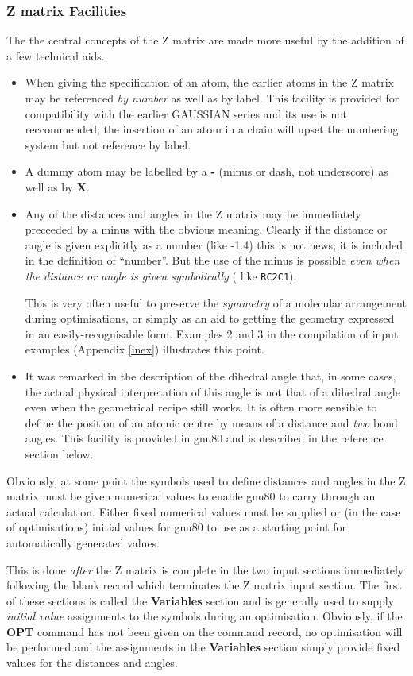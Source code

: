 \subsubsection{Z matrix Facilities}
The  the central concepts of the Z matrix
are made more useful by the addition of a few technical
aids.
\begin{itemize}
\item When giving the specification of an atom, the earlier atoms in
the Z matrix may be referenced {\em by number} as well as by label.
This facility is provided for compatibility with the earlier GAUSSIAN
series and its use is not reccommended; the insertion of an atom in a chain
will upset the numbering system but not reference by label.
\item A dummy atom may be labelled by a {\bf -} (minus or dash, not
underscore) as well as by {\bf X}.
\item Any of the distances and angles in the Z matrix may be immediately
preceeded by a minus with the obvious meaning. Clearly if the distance
or angle is given explicitly as a number (like -1.4) this is not news;
it is included in the definition of ``number''. But the use
of the minus is possible {\em even when the distance or angle is
given symbolically} ( like {\tt RC2C1}).

This is very often useful to preserve the {\em symmetry} of a molecular
arrangement during optimisations, or simply as an aid to getting
the geometry expressed in an easily-recognisable form. Examples 2 and 3
in the compilation of input examples (Appendix \ref{inex}) illustrates
this point.
\item It was remarked in the description of the dihedral angle
that, in some cases, the actual physical interpretation of this angle
is not that of a dihedral angle even when the geometrical recipe
still works. It is often more sensible to define the position of
an atomic centre by means of a distance and {\em two} bond angles.
This facility is provided in gnu80 and is described in the reference
section below.
\end{itemize}
Obviously, at some point the symbols used to define distances and angles
in the Z matrix must be given numerical values to enable gnu80
to carry through an actual calculation. Either fixed numerical values
must be supplied or (in the case of optimisations) initial values
for gnu80 to use as a starting point for automatically generated
values.

This is done {\em after} the Z matrix is complete in the two input
sections immediately following the blank record which terminates
the Z matrix input section. The first of these sections is called the
{\bf Variables} section and is generally used to supply {\em initial
value} assignments to the symbols during an optimisation. Obviously,
if the {\bf OPT} command has not been given on the command record, no
optimisation will be performed and the assignments in the {\bf Variables}
section simply provide fixed values for the distances and angles.

